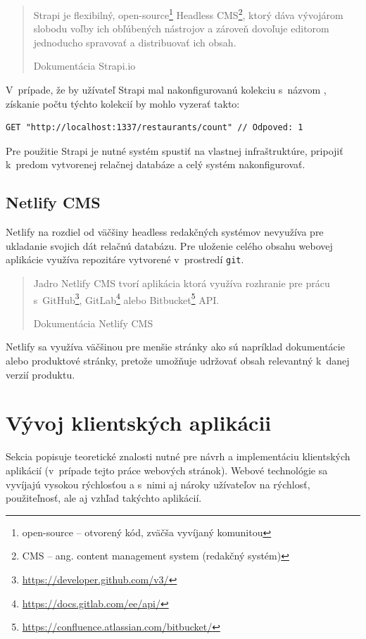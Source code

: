 \blockquote[Dokumentácia Strapi.io \cite{StrapiDocs}]{Strapi je flexibilný, open-source\footnote{open-source -- otvorený kód, zväčša vyvíjaný komunitou} Headless CMS\footnote{CMS -- ang. content management system (redakčný systém)}, ktorý dáva vývojárom slobodu voľby ich obľúbených nástrojov a zároveň dovoľuje editorom jednoducho spravovať a distribuovať ich obsah.}

\noindent V~prípade, že by užívateľ Strapi mal nakonfigurovanú kolekciu s~názvom , získanie počtu týchto kolekcií by mohlo vyzerať takto: \\

\lstset{style=CommonCodeStyle, language=TypeScript}

\begin{lstlisting}[caption=Príklad HTTP požiadavku na REST rozhranie Strapi.]
	GET "http://localhost:1337/restaurants/count" // Odpoved: 1
\end{lstlisting}

\bigskip

\noindent Pre použitie Strapi je nutné systém spustiť na vlastnej infraštruktúre, pripojiť k~predom vytvorenej relačnej databáze a celý systém nakonfigurovať.

\subsection{Netlify CMS}
Netlify na rozdiel od väčšiny headless redakčných systémov nevyužíva pre ukladanie svojich dát relačnú databázu. Pre uloženie celého obsahu webovej aplikácie využíva repozitáre vytvorené v~prostredí \texttt{git}.

\blockquote[Dokumentácia Netlify CMS \cite{NetlifyDocs}]{Jadro Netlify CMS tvorí  aplikácia ktorá využíva rozhranie pre prácu s~GitHub\footnote{\href{https://developer.github.com/v3/}{https://developer.github.com/v3/}}, GitLab\footnote{\href{https://docs.gitlab.com/ee/api/}{https://docs.gitlab.com/ee/api/}} alebo Bitbucket\footnote{\href{https://confluence.atlassian.com/bitbucket/}{https://confluence.atlassian.com/bitbucket/}} API.}

\noindent Netlify sa využíva väčšinou pre menšie stránky ako sú napríklad dokumentácie alebo produktové stránky, pretože umožňuje udržovať obsah relevantný k~danej verzií produktu.

\section{Vývoj klientských aplikácii}
\label{section:client_dev}
Sekcia popisuje teoretické znalosti nutné pre návrh a implementáciu klientských aplikácií (v~prípade tejto práce webových stránok). Webové technológie sa vyvíjajú vysokou rýchlosťou a s~nimi aj nároky užívateľov na rýchlosť, použiteľnosť, ale aj vzhľad takýchto aplikácií.

